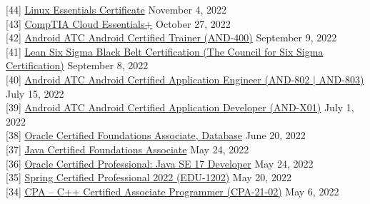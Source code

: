 \documentclass[10pt]{res} %
\begin{document}
\begin{resume}
{[44]} \phantom{0}\href{https://www.credly.com/badges/4819f13c-0e42-41ce-8d58-7af289ccdabb}{\color{blue}Linux Essentials Certificate} \hfill November 4, 2022 \\
{[43]} \phantom{0}\href{https://www.credly.com/badges/f729642a-e61b-4cb5-b38e-a153d36ffe5d}{\color{blue}CompTIA Cloud Essentials+} \hfill October 27, 2022 \\
{[42]} \phantom{0}\href{https://androidatc.com/_transcript.php?action=public&u=ksuc1NfjztZglJacwtHW5%2Bmpy5%2BRmpyP0dPf}{\color{blue}Android ATC Android Certified Trainer (AND-400)} \hfill September 9, 2022 \\
{[41]} \phantom{0}\href{https://badgr.com/public/assertions/JWxE8golTEOCYTbPajLuig}{\color{blue}Lean Six Sigma Black Belt Certification (The Council for Six Sigma Certification)} \hfill September 8, 2022 \\
{[40]} \phantom{0}\href{https://androidatc.com/_transcript.php?action=public&u=ksuc1NfjztZglJacwtHW5%2Bmpy5%2BRmpyP0dPf}{\color{blue}Android ATC Android Certified Application Engineer (AND-802 $|$ AND-803)} \hfill July 15, 2022 \\
{[39]} \phantom{0}\href{https://androidatc.com/_transcript.php?action=public&u=ksuc1NfjztZglJacwtHW5%2Bmpy5%2BRmpyP0dPf}{\color{blue}Android ATC Android Certified Application Developer (AND-X01)} \hfill July 1, 2022 \\
{[38]} \phantom{0}\href{https://catalog-education.oracle.com/pls/certview/sharebadge?id=77FC55392CD36D4EB00ADB83CC98A2F72E480B62A0CFE7BFB288C8DDFCA3B3E1}{\color{blue}Oracle Certified Foundations Associate, Database} \hfill June 20, 2022 \\
{[37]} \phantom{0}\href{https://catalog-education.oracle.com/pls/certview/sharebadge?id=1BFDA64A49108D96B5DF019B46D75B21C51B23C34B6C474BF631C4F17EF92C1B}{\color{blue}Java Certified Foundations Associate} \hfill May 24, 2022 \\
{[36]} \phantom{0}\href{https://catalog-education.oracle.com/pls/certview/sharebadge?id=6EEFFDDE0F96A660F5E7E359162CE8ED95385BDDD3B8EA391E487B1CC7094E5C}{\color{blue}Oracle Certified Professional: Java SE 17 Developer} \hfill May 24, 2022 \\
{[35]} \phantom{0}\href{https://cp.certmetrics.com/vmware/en/public/verify/credential/QQCJ72TDCBB1QGGD}{\color{blue}Spring Certified Professional 2022 (EDU-1202)} \hfill May 20, 2022 \\
{[34]} \phantom{0}\href{https://www.credly.com/badges/00be8e8d-2779-478a-ab8b-08eace9c25bd}{\color{blue}CPA -- C++ Certified Associate Programmer (CPA-21-02)} \hfill May 6, 2022 \\

\end{resume}
\end{document}
